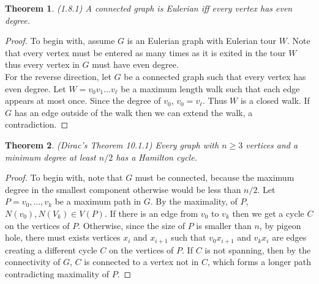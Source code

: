\documentclass[12pt]{article}
\newtheorem{theorem}{Theorem}
\begin{document}
\begin{theorem} (1.8.1) A connected graph is Eulerian iff every vertex
  has even degree.
\end{theorem}
\begin{proof} To begin with, assume $G$ is an Eulerian graph with
  Eulerian tour $W$. Note that every vertex must be entered as many
  times as it is exited in the tour $W$ thus every vertex in $G$ must
  have even degree.\\
  For the reverse direction, let $G$ be a connected graph such that
  every vertex has even degree. Let $W = v_0 v_1 \ldots v_\ell$ be a
  maximum length walk such that each edge appears at most once. Since
  the degree of $v_0$, $v_0 = v_\ell$. Thus $W$ is a closed walk. If
  $G$ has an edge outside of the walk then we can extend the walk, a
  contradiction.
\end{proof}

\begin{theorem} (Dirac's Theorem 10.1.1) Every graph with $n \geq 3$
  vertices and a minimum degree at least $n/2$ has a Hamilton cycle.
\end{theorem}
\begin{proof} To begin with, note that $G$ must be connected, because
  the maximum degree in the smallest component otherwise would be less
  than $n/2$.  Let $P = v_0, \ldots, v_k$ be a maximum path in $G$. By
  the maximality, of $P$, $N(v_0), N(V_k) \in V(P)$. If there is an
  edge from $v_0$ to $v_k$ then we get a cycle $C$ on the vertices of
  $P$. Otherwise, since the size of $P$ is smaller than $n$, by pigeon
  hole, there must exists vertices $x_i$ and $x_{i + 1}$ such that
  $v_0 x_{i + 1}$ and $v_k x_i$ are edges creating a different cycle
  $C$ on the vertices of $P$. If $C$ is not spanning, then by the
  connectivity of $G$, $C$ is connected to a vertex not in $C$, which
  forms a longer path contradicting maximality of $P$.
\end{proof}
\end{document}
